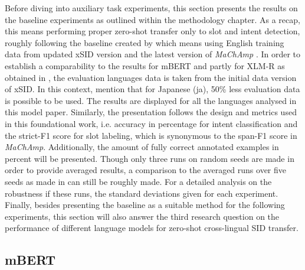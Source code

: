 \documentclass[11pt,a4paper,twoside,openright]{scrbook}
\begin{document}
Before diving into auxiliary task experiments, this section presents the results on the baseline experiments as outlined within the methodology chapter. As a recap, this means performing proper zero-shot transfer only to slot and intent detection, roughly following the baseline created by \citet{van-der-goot-etal-2021-masked} which means using English training data from updated xSID version and the latest version of \textit{MaChAmp} \citep{van-der-goot-etal-2021-massive}. In order to establish a comparability to the results for mBERT and partly for XLM-R as obtained in \citet{van-der-goot-etal-2021-masked}, the evaluation languages data is taken from the initial data version of xSID. In this context, \citet{van-der-goot-etal-2021-masked} mention that for Japanese (ja), 50\% less evaluation data is possible to be used. The results are displayed for all the languages analysed in this model paper. Similarly, the presentation follows the design and metrics used in this foundational work, i.e. accuracy in percentage for intent classification and the strict-F1 score for slot labeling, which is synonymous to the span-F1 score in \textit{MaChAmp}. Additionally, the amount of fully correct annotated examples in percent will be presented. Though only three runs on random seeds are made in order to provide averaged results, a comparison to the averaged runs over five seeds as made in \citet{van-der-goot-etal-2021-masked} can still be roughly made. For a detailed analysis on the robustness if these runs, the standard deviations given for each experiment. Finally, besides presenting the baseline as a suitable method for the following experiments, this section will also answer the third research question on the performance of different language models for zero-shot cross-lingual SID transfer. 








\subsection{mBERT}
\end{document}
